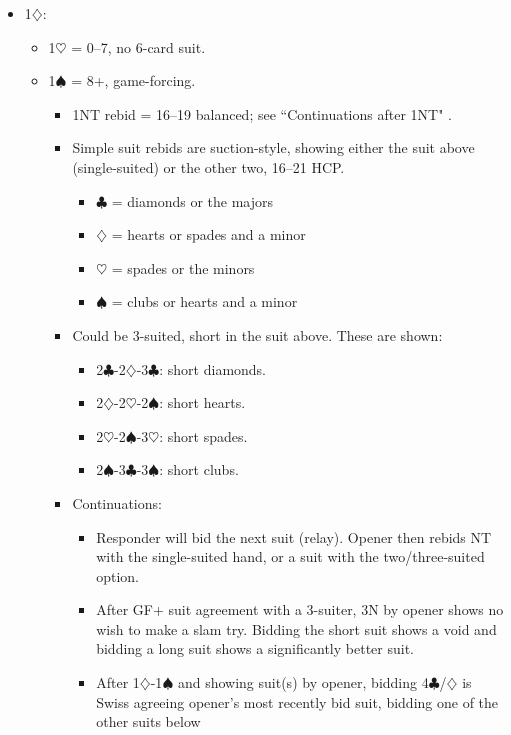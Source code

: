 \documentclass[a4paper,14pt]{extarticle}
\begin{document}
\begin{itemize}
\newpage

\item 1$\diamondsuit$:
	\begin{itemize}
   \item 1$\heartsuit$ = 0--7, no 6-card suit.
   \item 1$\spadesuit$ = 8+, game-forcing.
		\begin{itemize}
      \item 1NT rebid = 16--19 balanced; see ``Continuations after 1NT" .
      \item Simple suit rebids are suction-style, showing either the suit above
         (single-suited) or the other two, 16--21 HCP.
			\begin{itemize}
			\item $\clubsuit$ = diamonds or the majors
			\item $\diamondsuit$ = hearts or spades and a minor
			\item $\heartsuit$ = spades or the minors
			\item $\spadesuit$ = clubs or hearts and a minor
			\end{itemize}
		\item Could be 3-suited, short in the suit above. These are shown: 
			\begin{itemize}
         \item 2$\clubsuit$-2$\diamondsuit$-3$\clubsuit$: short diamonds.
			\item 2$\diamondsuit$-2$\heartsuit$-2$\spadesuit$: short hearts. 
			\item 2$\heartsuit$-2$\spadesuit$-3$\heartsuit$: short spades.
         \item 2$\spadesuit$-3$\clubsuit$-3$\spadesuit$: short clubs.
			\end{itemize}
		\item Continuations:
			\begin{itemize}
			\item Responder will bid the next suit (relay). Opener then rebids NT with the
				single-suited hand, or a suit with the two/three-suited option.
			\item After GF+ suit agreement with a 3-suiter, 3N by opener shows no wish to make
				a slam try. Bidding the short suit shows a void and bidding a long suit shows
				a significantly better suit.
			\item After 1$\diamondsuit$-1$\spadesuit$ and showing suit(s) by opener, bidding 4$\clubsuit$/$\diamondsuit$
				is Swiss  agreeing opener's most recently bid suit, bidding one of the other suits below 

\end{itemize}
\end{itemize}
\end{itemize}
\end{itemize}
\end{document}
